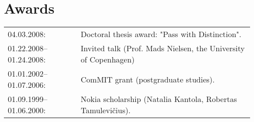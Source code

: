 \documentclass[a4paper,11pt]{article}
\begin{document}
\section*{Awards}
%
\begin{tabular}{ll}
        04.03.2008: & Doctoral thesis award: "Pass with Distinction".\\
        01.22.2008--01.24.2008: & Invited talk (Prof. Mads Nielsen, the University of Copenhagen)\\
        01.01.2002--01.07.2006:& ComMIT grant (postgraduate studies).\\
        01.09.1999--01.06.2000:& Nokia scholarship (Natalia Kantola, Robertas Tamulevi\v{c}ius).
\end{tabular}
%
%

\end{document}

